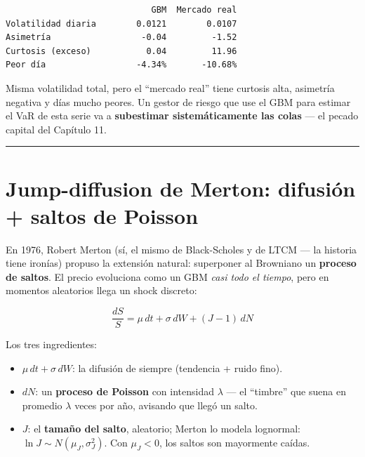 \documentclass[
  spanish,
  letterpaper,
  DIV=11,
  numbers=noendperiod]{scrreprt}
\providecommand{\tightlist}{%
  \setlength{\itemsep}{0pt}\setlength{\parskip}{0pt}}
\begin{document}
\begin{verbatim}
                             GBM  Mercado real
Volatilidad diaria        0.0121        0.0107
Asimetría                  -0.04         -1.52
Curtosis (exceso)           0.04         11.96
Peor día                  -4.34%       -10.68%
\end{verbatim}

Misma volatilidad total, pero el ``mercado real'' tiene curtosis alta,
asimetría negativa y días mucho peores. Un gestor de riesgo que use el
GBM para estimar el VaR de esta serie va a \textbf{subestimar
sistemáticamente las colas} --- el pecado capital del Capítulo 11.

\begin{center}\rule{0.5\linewidth}{0.5pt}\end{center}

\chapter{Jump-diffusion de Merton: difusión + saltos de
Poisson}\label{jump-diffusion-de-merton-difusiuxf3n-saltos-de-poisson}

En 1976, Robert Merton (sí, el mismo de Black-Scholes y de LTCM --- la
historia tiene ironías) propuso la extensión natural: superponer al
Browniano un \textbf{proceso de saltos}. El precio evoluciona como un
GBM \emph{casi todo el tiempo}, pero en momentos aleatorios llega un
shock discreto:

\[\frac{dS}{S} = \mu\, dt + \sigma\, dW + (J - 1)\, dN\]

Los tres ingredientes:

\begin{itemize}
\tightlist
\item
  \(\mu\,dt + \sigma\,dW\): la difusión de siempre (tendencia + ruido
  fino).
\item
  \(dN\): un \textbf{proceso de Poisson} con intensidad \(\lambda\) ---
  el ``timbre'' que suena en promedio \(\lambda\) veces por año,
  avisando que llegó un salto.
\item
  \(J\): el \textbf{tamaño del salto}, aleatorio; Merton lo modela
  lognormal: \(\ln J \sim N(\mu_J, \sigma_J^2)\). Con \(\mu_J < 0\), los
  saltos son mayormente caídas.
\end{itemize}
\end{document}
